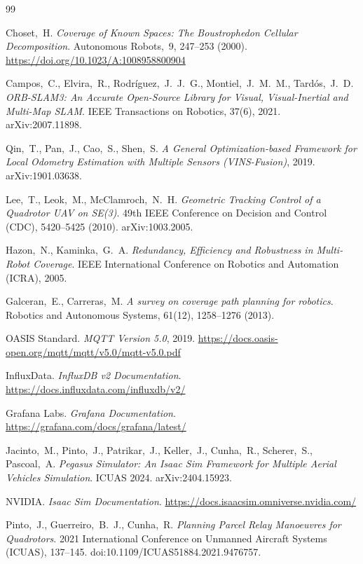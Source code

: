 \begin{thebibliography}{99}

Choset,~H.
\textit{Coverage of Known Spaces: The Boustrophedon Cellular Decomposition}.
Autonomous Robots,~9, 247–253 (2000).
\url{https://doi.org/10.1023/A:1008958800904}

Campos,~C., Elvira,~R., Rodríguez,~J.~J.~G., Montiel,~J.~M.~M., Tardós,~J.~D.
\textit{ORB-SLAM3: An Accurate Open-Source Library for Visual, Visual-Inertial and Multi-Map SLAM}.
IEEE Transactions on Robotics, 37(6), 2021.
arXiv:2007.11898.

Qin,~T., Pan,~J., Cao,~S., Shen,~S.
\textit{A General Optimization-based Framework for Local Odometry Estimation with Multiple Sensors (VINS-Fusion)}, 2019.
arXiv:1901.03638.

Lee,~T., Leok,~M., McClamroch,~N.~H.
\textit{Geometric Tracking Control of a Quadrotor UAV on SE(3)}.
49th IEEE Conference on Decision and Control (CDC), 5420–5425 (2010).
arXiv:1003.2005.

Hazon,~N., Kaminka,~G.~A.
\textit{Redundancy, Efficiency and Robustness in Multi-Robot Coverage}.
IEEE International Conference on Robotics and Automation (ICRA), 2005.

Galceran,~E., Carreras,~M.
\textit{A survey on coverage path planning for robotics}.
Robotics and Autonomous Systems, 61(12), 1258–1276 (2013).

OASIS Standard.
\textit{MQTT Version 5.0}, 2019.
\url{https://docs.oasis-open.org/mqtt/mqtt/v5.0/mqtt-v5.0.pdf}

InfluxData.
\textit{InfluxDB v2 Documentation}.
\url{https://docs.influxdata.com/influxdb/v2/}

Grafana Labs.
\textit{Grafana Documentation}.
\url{https://grafana.com/docs/grafana/latest/}

Jacinto,~M., Pinto,~J., Patrikar,~J., Keller,~J., Cunha,~R., Scherer,~S., Pascoal,~A.
\textit{Pegasus Simulator: An Isaac Sim Framework for Multiple Aerial Vehicles Simulation}.
ICUAS 2024.
arXiv:2404.15923.

NVIDIA.
\textit{Isaac Sim Documentation}.
\url{https://docs.isaacsim.omniverse.nvidia.com/}

Pinto,~J., Guerreiro,~B.~J., Cunha,~R.
\textit{Planning Parcel Relay Manoeuvres for Quadrotors}.
2021 International Conference on Unmanned Aircraft Systems (ICUAS), 137–145.
doi:10.1109/ICUAS51884.2021.9476757.


\end{thebibliography}
